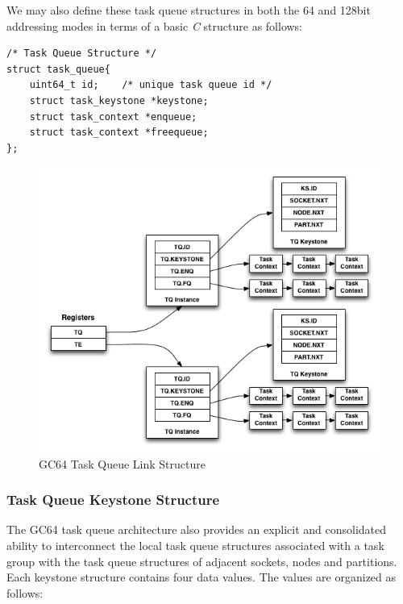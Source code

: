 \documentclass{article}
\begin{document}
We may also define these task queue structures in both the 64 and 128bit addressing modes in terms of a basic \emph{C} structure as follows: 

\begin{verbatim}
/* Task Queue Structure */
struct task_queue{
	uint64_t id;	/* unique task queue id */
	struct task_keystone *keystone;
	struct task_context *enqueue;
	struct task_context *freequeue;
};
\end{verbatim}

\begin{figure}[h!]
\begin{center}
\includegraphics[width=1.00\textwidth]{gc64-task-queue.png}
\caption{GC64 Task Queue Link Structure}
\end{center}
\label{figure:taskqueue}
\end{figure} 

\subsubsection{Task Queue Keystone Structure}

The GC64 task queue architecture also provides an explicit and consolidated ability to 
interconnect the local task queue structures associated with a task group with 
the task queue structures of adjacent sockets, nodes and partitions.  Each keystone structure contains
four data values.  The values are organized as follows: 
\end{document}
